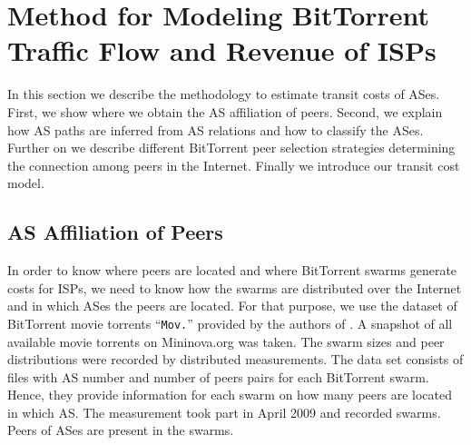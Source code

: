\section{Method for Modeling BitTorrent Traffic Flow and Revenue of ISPs}\label{sec:methodology}

In this section we describe the methodology to estimate transit costs of ASes. First, we show where we obtain the AS affiliation of peers. Second, we explain how AS paths are inferred from AS relations and how to classify the ASes. Further on we describe different BitTorrent peer selection strategies determining the connection among peers in the Internet. Finally we introduce our transit cost model.

\subsection{AS Affiliation of Peers}

In order to know where peers are located and where BitTorrent swarms generate costs for ISPs, we need to know how the swarms are distributed over the Internet and in which ASes the peers are located. For that purpose, we use the dataset of BitTorrent movie torrents ``\texttt{Mov.}'' provided by the authors of \cite{Hossfeld2011}. A snapshot of all available movie torrents on Mininova.org was taken. The swarm sizes and peer distributions were recorded by distributed measurements. The data set consists of files with AS number and number of peers pairs for each BitTorrent swarm. Hence, they provide information for each swarm on how many peers are located in which AS.   The measurement took part in April 2009 and recorded  swarms. Peers of  ASes are present in the swarms.





